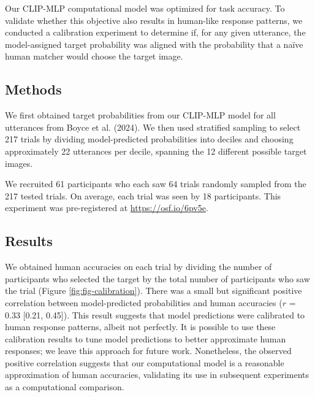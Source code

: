 \documentclass[10pt, letterpaper]{article}
\begin{document}
Our CLIP-MLP computational model was optimized for task accuracy. To
validate whether this objective also results in human-like response
patterns, we conducted a calibration experiment to determine if, for any
given utterance, the model-assigned target probability was aligned with
the probability that a naïve human matcher would choose the target
image.

\subsection{Methods}\label{methods}

We first obtained target probabilities from our CLIP-MLP model for all
utterances from Boyce et al. (2024). We then used stratified sampling to
select 217 trials by dividing model-predicted probabilities into deciles
and choosing approximately 22 utterances per decile, spanning the 12
different possible target images.

We recruited 61 participants who each saw 64 trials randomly sampled
from the 217 tested trials. On average, each trial was seen by 18
participants. This experiment was pre-registered at
\url{https://osf.io/6pv5e}.

\subsection{Results}\label{results}

We obtained human accuracies on each trial by dividing the number of
participants who selected the target by the total number of participants
who saw the trial (Figure \ref{fig:fig-calibration}). There was a small
but significant positive correlation between model-predicted
probabilities and human accuracies (\(r\) = 0.33 {[}0.21, 0.45{]}). This
result suggests that model predictions were calibrated to human response
patterns, albeit not perfectly. It is possible to use these calibration
results to tune model predictions to better approximate human responses;
we leave this approach for future work. Nonetheless, the observed
positive correlation suggests that our computational model is a
reasonable approximation of human accuracies, validating its use in
subsequent experiments as a computational comparison.
\end{document}
